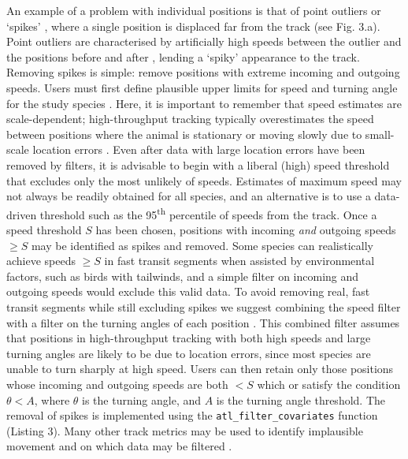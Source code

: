 \documentclass[10pt,paper=a4,headings=standardclasses
]{scrartcl}
\begin{document}
An example of a problem with individual positions is that of point outliers or `spikes' \citep{bjorneraas2010}, where a single position is displaced far from the track (see Fig. 3.a).
Point outliers are characterised by artificially high speeds between the outlier and the positions before and after \citep[called incoming and outgoing speed, respectively][]{bjorneraas2010}, lending a `spiky' appearance to the track.
Removing spikes is simple: remove positions with extreme incoming and outgoing speeds.
Users must first define plausible upper limits for speed and turning angle for the study species \citep{calenge2009, seidel2018}.
Here, it is important to remember that speed estimates are scale-dependent; high-throughput tracking typically overestimates the speed between positions where the animal is stationary or moving slowly due to small-scale location errors \citep{ranacher2016, noonan2019}. 
Even after data with large location errors have been removed by filters, it is advisable to begin with a liberal (high) speed threshold that excludes only the most unlikely of speeds.
Estimates of maximum speed may not always be readily obtained for all species, and an alternative is to use a data-driven threshold such as the 95\textsuperscript{th} percentile of speeds from the track.
Once a speed threshold $S$ has been chosen, positions with incoming \textit{and} outgoing speeds $\geq S$ may be identified as spikes and removed.
Some species can realistically achieve speeds $\geq S$ in fast transit segments when assisted by environmental factors, such as birds with tailwinds, and a simple filter on incoming and outgoing speeds would exclude this valid data.
To avoid removing real, fast transit segments while still excluding spikes we suggest combining the speed filter with a filter on the turning angles of each position \citep[see][]{calenge2009}.
This combined filter assumes that positions in high-throughput tracking with both high speeds and large turning angles are likely to be due to location errors, since most species are unable to turn sharply at high speed.
Users can then retain only those positions whose incoming and outgoing speeds are both $< S$ which or satisfy the condition $\theta < A$, where $\theta$ is the turning angle, and $A$ is the turning angle threshold.
The removal of spikes is implemented using the \texttt{atl\_filter\_covariates} function (Listing 3).
Many other track metrics may be used to identify implausible movement and on which data may be filtered \citep{seidel2018}.
\end{document}
